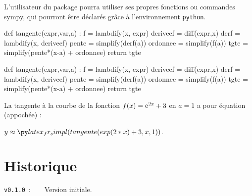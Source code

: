 \documentclass[french,a4paper,11pt]{article}
\begin{document}
\begin{tipblock}
L'utilisateur du package pourra utiliser ses propres fonctions ou commandes \textsf{sympy}, qui pourront être déclarés grâce à l'environnement \texttt{python}.
\end{tipblock}

\begin{bloctext}
\begin{python}
def tangente(expr,var,a) :
	f = lambdify(x, expr)
	deriveef = diff(expr,x)
	derf = lambdify(x, deriveef)
	pente = simplify(derf(a))
	ordonnee = simplify(f(a))
	tgte = simplify(pente*(x-a) + ordonnee)
	return tgte
	
\end{python}
\end{bloctext}

\begin{python}
def tangente(expr,var,a) :
	f = lambdify(x, expr)
	deriveef = diff(expr,x)
	derf = lambdify(x, deriveef)
	pente = simplify(derf(a))
	ordonnee = simplify(f(a))
	tgte = simplify(pente*(x-a) + ordonnee)
	return tgte
	
\end{python}

\begin{bloctext}
La tangente à la courbe de la fonction $f(x)=\mathrm{e}^{2x}+3$ en $a=1$ a pour équation (appochée) :

$y \approx \sympycalc{tangente(exp(2*x)+3,x,1)}$.
\end{bloctext}

\section{Historique}

\verb|v0.1.0|~:~~~~Version initiale.
\end{document}
